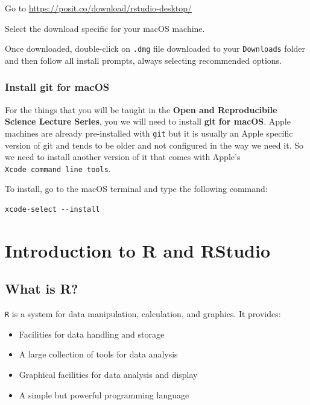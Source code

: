 \documentclass[
  12pt,
]{book}
\begin{document}
Go to \url{https://posit.co/download/rstudio-desktop/}

Select the download specific for your macOS machine.

Once downloaded, double-click on \texttt{.dmg} file downloaded to your \texttt{Downloads} folder and then follow all install prompts, always selecting recommended options.

\hypertarget{install-git-for-macos}{%
\subsection{Install git for macOS}\label{install-git-for-macos}}

For the things that you will be taught in the \textbf{Open and Reproducibile Science Lecture Series}, you we will need to install \textbf{git for macOS}. Apple machines are already pre-installed with \texttt{git} but it is usually an Apple specific version of git and tends to be older and not configured in the way we need it. So we need to install another version of it that comes with Apple's \texttt{Xcode\ command\ line\ tools}.

To install, go to the macOS terminal and type the following command:

\begin{verbatim}
xcode-select --install
\end{verbatim}

\hypertarget{intro-r}{%
\chapter{Introduction to R and RStudio}\label{intro-r}}

\hypertarget{what-r}{%
\section{What is R?}\label{what-r}}

\texttt{R} is a system for data manipulation, calculation, and graphics. It provides:

\begin{itemize}
\item
  Facilities for data handling and storage
\item
  A large collection of tools for data analysis
\item
  Graphical facilities for data analysis and display
\item
  A simple but powerful programming language
\end{itemize}
\end{document}

